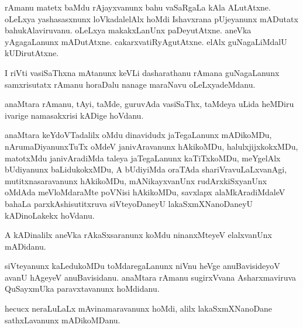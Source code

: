 \documentclass{article}
\begin{document}
\begin{mn}
rAmanu  matetx  baMdu  rAjayxvanunx  bahu  vaSaRgaLa  kAla  ALutAtxne.  oLeLxya  yashasasxnunx  loVkadalelAlx  hoMdi  
Ishavxrana  pUjeyanunx  mADutatx  bahukAlaviruvanu.  oLeLxya  makakxLanUnx  paDeyutAtxne.  aneVka  yAgagaLanunx  mADutAtxne.  
cakarxvatiRyAgutAtxne.  elAlx  guNagaLiMdalU  kUDirutAtxne.
\end{mn}

\begin{mn}
I  riVti  vasiSaThxna  mAtanunx  keVLi  dasharathanu  rAmana  guNagaLanunx  samxrisutatx  rAmanu  horaDalu  nanage  
maraNavu  oLeLxyadeMdanu.
\end{mn}

\begin{mn}
anaMtara  rAmanu,  tAyi,  taMde,  guruvAda  vasiSaThx,  taMdeya  uLida  heMDiru  ivarige  namasakxrisi  kADige  hoVdanu.
\end{mn}

\begin{mn}
anaMtara  keYdoVTadalilx  oMdu  dinavidudx  jaTegaLanunx  mADikoMDu,  nArumaDiyanunxTuTx  oMdeV  janivAravanunx  hAkikoMDu,  
halulxjijxkokxMDu,  matotxMdu  janivAradiMda  taleya  jaTegaLanunx  kaTiTxkoMDu,  meYgelAlx  bUdiyanunx  baLidukokxMDu,  A  
bUdiyiMda  oraTAda  shariVravuLaLxvanAgi,  mutitxnasaravanunx  hAkikoMDu,  mANikayxvanUnx  rudArxkiSxyanUnx  oMdAda  meVloMdaraMte  
poVNisi  hAkikoMDu,  savxlapx  alaMkAradiMdaleV  bahaLa  parxkAshisutitxruva  siVteyoDaneyU  lakaSxmXNanoDaneyU  kADinoLakekx  hoVdanu.
\end{mn}

\begin{mn}
A  kADinalilx  aneVka  rAkaSxsaranunx  koMdu  ninanxMteyeV  elalxvanUnx  mADidanu.
\end{mn}

\begin{mn}
siVteyanunx  kaLedukoMDu  toMdaregaLanunx  niVnu  heVge  anuBavisideyoV  avanU  hAgeyeV  anuBavisidanu.  anaMtara  rAmanu  
sugirxVvana  Asharxmaviruva  QuSayxmUka  paravxtavanunx  hoMdidanu.
\end{mn}

\begin{mn}
hecucx  neraLuLaLx  mAvinamaravanunx  hoMdi,  alilx  lakaSxmXNanoDane  sathxLavanunx  mADikoMDanu.
\end{mn}
\end{document}
